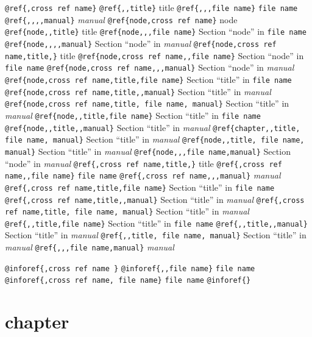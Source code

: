 \documentclass{book}
\makeatletter
\renewcommand\mainmatter{\clearpage\@mainmattertrue\pagenumbering{arabic}}
\newcommand\GNUTexinfomainmatter{\mainmatter}
\newcommand{\GNUTexinfosetsingleheader}{\pagestyle{single}}
\makeatother
\begin{document}
\begin{titlepage}
\texttt{@ref\{,cross ref name\}} 
\texttt{@ref\{,,title\}} title
\texttt{@ref\{,,,file name\}} \texttt{file name}
\texttt{@ref\{,,,,manual\}} \textsl{manual}
\texttt{@ref\{node,cross ref name\}} node
\texttt{@ref\{node,,title\}} title
\texttt{@ref\{node,,,file name\}} Section ``node'' in \texttt{file name}
\texttt{@ref\{node,,,,manual\}} Section ``node'' in \textsl{manual}
\texttt{@ref\{node,cross ref name,title,\}} title
\texttt{@ref\{node,cross ref name,,file name\}} Section ``node'' in \texttt{file name}
\texttt{@ref\{node,cross ref name,,,manual\}} Section ``node'' in \textsl{manual}
\texttt{@ref\{node,cross ref name,title,file name\}} Section ``title'' in \texttt{file name}
\texttt{@ref\{node,cross ref name,title,,manual\}} Section ``title'' in \textsl{manual}
\texttt{@ref\{node,cross ref name,title, file name, manual\}} Section ``title'' in \textsl{manual}
\texttt{@ref\{node,,title,file name\}} Section ``title'' in \texttt{file name}
\texttt{@ref\{node,,title,,manual\}} Section ``title'' in \textsl{manual}
\texttt{@ref\{chapter,,title, file name, manual\}} Section ``title'' in \textsl{manual}
\texttt{@ref\{node,,title, file name, manual\}} Section ``title'' in \textsl{manual}
\texttt{@ref\{node,,,file name,manual\}} Section ``node'' in \textsl{manual}
\texttt{@ref\{,cross ref name,title,\}} title
\texttt{@ref\{,cross ref name,,file name\}} \texttt{file name}
\texttt{@ref\{,cross ref name,,,manual\}} \textsl{manual}
\texttt{@ref\{,cross ref name,title,file name\}} Section ``title'' in \texttt{file name}
\texttt{@ref\{,cross ref name,title,,manual\}} Section ``title'' in \textsl{manual}
\texttt{@ref\{,cross ref name,title, file name, manual\}} Section ``title'' in \textsl{manual}
\texttt{@ref\{,,title,file name\}} Section ``title'' in \texttt{file name}
\texttt{@ref\{,,title,,manual\}} Section ``title'' in \textsl{manual}
\texttt{@ref\{,,title, file name, manual\}} Section ``title'' in \textsl{manual}
\texttt{@ref\{,,,file name,manual\}} \textsl{manual}

\texttt{@inforef\{,cross ref name \}} 
\texttt{@inforef\{,,file name\}} \texttt{file name}
\texttt{@inforef\{,cross ref name, file name\}} \texttt{file name}
\texttt{@inforef\{\}} 


\end{titlepage}
\GNUTexinfosetsingleheader{}%
\GNUTexinfomainmatter
\tableofcontents\newpage





\label{anchor:Top}%
\chapter{{chapter}}
\label{anchor:chapter}%
\end{document}
